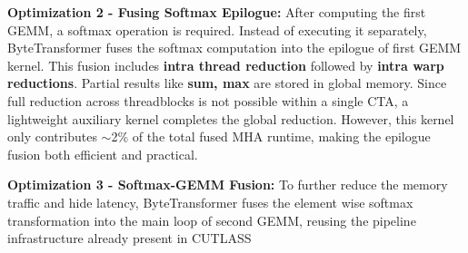 \documentclass{article}
\begin{document}
\textbf{Optimization 2 - Fusing Softmax Epilogue: } After computing the first GEMM, a softmax operation is required. Instead of executing it separately, ByteTransformer fuses the softmax computation into the epilogue of first GEMM kernel. This fusion includes \textbf{intra thread reduction} followed by \textbf{intra warp reductions}. Partial results like \textbf{sum, max} are stored in global memory. Since full reduction across threadblocks is not possible within a single CTA, a lightweight auxiliary kernel completes the global reduction. However, this kernel only contributes $\sim$2\% of the total fused MHA runtime, making the epilogue fusion both efficient and practical.

\textbf{Optimization 3 - Softmax-GEMM Fusion: }To further reduce the memory traffic and hide latency, ByteTransformer fuses the element wise softmax transformation into the main loop of second GEMM, reusing the pipeline infrastructure already present in CUTLASS
\end{document}
